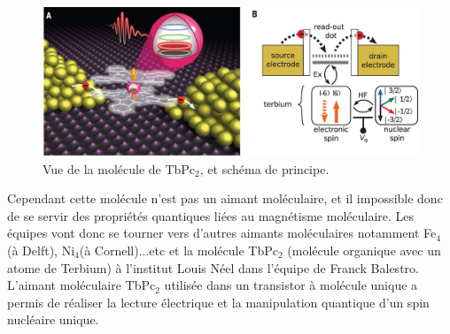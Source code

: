 \begin{figure}[h]
    \begin{center}
        \includegraphics{Images/TbPc2.jpg}
        \caption{Vue de la molécule de TbPc$_2$, et schéma de principe.}
        \label{fig:}
    \end{center}
\end{figure}

Cependant cette molécule n'est pas un aimant moléculaire, et il impossible donc de se servir des propriétés quantiques liées au magnétisme moléculaire. Les équipes vont donc se tourner vers d'autres aimants moléculaires notamment Fe$_{4}$ (à Delft), Ni$_{4}$(à Cornell)...etc et la molécule TbPc$_{2}$ (molécule organique avec un atome de Terbium) à l'institut Louis Néel dans l'équipe de Franck Balestro. L'aimant moléculaire TbPc$_{2}$ utilisée dans un transistor à molécule unique a permis de réaliser la lecture électrique et la manipulation quantique d'un spin nucléaire unique.
